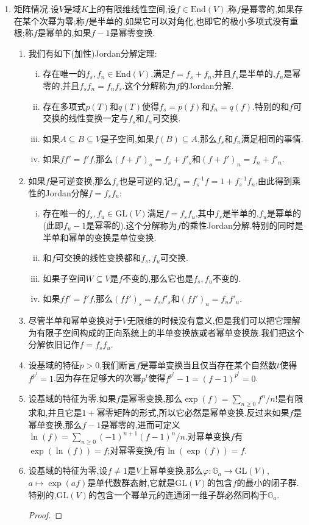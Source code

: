 \begin{enumerate}
	\item 矩阵情况.设$V$是域$K$上的有限维线性空间,设$f\in\mathrm{End}(V)$,称$f$是幂零的,如果存在某个次幂为零;称$f$是半单的,如果它可以对角化,也即它的极小多项式没有重根;称$f$是幂单的,如果$f-1$是幂零变换.
	\begin{enumerate}[(1)]
		\item 我们有如下(加性)Jordan分解定理:
		\begin{enumerate}[(i)]
			\item 存在唯一的$f_s,f_n\in\mathrm{End}(V)$,满足$f=f_s+f_n$,并且$f_s$是半单的,$f_n$是幂零的,并且$f_sf_n=f_nf_s$.这个分解称为$f$的Jordan分解.
			\item 存在多项式$p(T)$和$q(T)$使得$f_s=p(f)$和$f_n=q(f)$.特别的和$f$可交换的线性变换一定与$f_s$和$f_n$可交换.
			\item 如果$A\subseteq B\subseteq V$是子空间,如果$f(B)\subseteq A$,那么$f_s$和$f_n$满足相同的事情.
			\item 如果$ff'=f'f$,那么$(f+f')_s=f_s+f'_s$和$(f+f')_n=f_n+f'_n$.
		\end{enumerate}
	    \item 如果$f$是可逆变换,那么$f_s$也是可逆的,记$f_u=f_s^{-1}f=1+f_s^{-1}f_n$,由此得到乘性的Jordan分解$f=f_sf_u$:
	    \begin{enumerate}[(i)]
	    	\item 存在唯一的$f_s,f_u\in\mathrm{GL}(V)$满足$f=f_sf_u$,其中$f_s$是半单的,$f_u$是幂单的(此即$f_u-1$是幂零的).这个分解称为$f$的乘性Jordan分解.特别的同时是半单和幂单的变换是单位变换.
	    	\item 和$f$可交换的线性变换都和$f_s,f_u$可交换.
	    	\item 如果子空间$W\subseteq V$是$f$不变的,那么它也是$f_s,f_u$不变的.
	    	\item 如果$ff'=f'f$,那么$(ff')_s=f_sf'_s$和$(ff')_u=f_uf'_u$.
	    \end{enumerate}
        \item 尽管半单和幂单变换对于$V$无限维的时候没有意义,但是我们可以把它理解为有限子空间构成的正向系统上的半单变换族或者幂单变换族.我们把这个分解依旧记作$f=f_sf_u$.
        \item 设基域的特征$p>0$,我们断言$f$是幂单变换当且仅当存在某个自然数$t$使得$f^{p^t}=1$.因为存在足够大的次幂$p^t$使得$f^{p^t}-1=(f-1)^{p^t}=0$.
        \item 设基域的特征为零.如果$f$是幂零变换,那么$\exp(f)=\sum_{n\ge0}f^n/n!$是有限求和,并且它是$1+$幂零矩阵的形式,所以它必然是幂单变换.反过来如果$f$是幂单变换,那么$f-1$是幂零的,进而可定义$\ln(f)=\sum_{n\ge0}(-1)^{n+1}(f-1)^n/n$.对幂单变换$f$有$\exp(\ln(f))=f$;对幂零变换$f$有$\ln(\exp(f))=f$.
        \item 设基域的特征为零,设$f\not=1$是$V$上幂单变换,那么$\varphi:\mathbb{G}_a\to\mathrm{GL}(V)$,$a\mapsto\exp(af)$是单代数群态射,它就是$\mathrm{GL}(V)$的包含$f$的最小的闭子群.特别的,$\mathrm{GL}(V)$的包含一个幂单元的连通闭一维子群必然同构于$\mathbb{G}_a$.
        \begin{proof}
        	

\end{proof}
\end{enumerate}
\end{enumerate}
